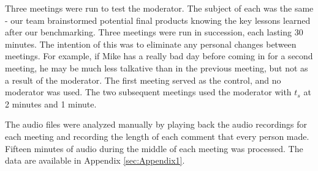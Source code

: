 Three meetings were run to test the moderator. The subject of each was the same - our team brainstormed potential final products knowing the key lessons learned after our benchmarking. Three meetings were run in succession, each lasting 30 minutes. The intention of this was to eliminate any personal changes between meetings. For example, if Mike has a really bad day before coming in for a second meeting, he may be much less talkative than in the previous meeting, but not as a result of the moderator. The first meeting served as the control, and no moderator was used. The two subsequent meetings used the moderator with $t_{s}$ at 2 minutes and 1 minute.

The audio files were analyzed manually by playing back the audio recordings for each meeting and recording the length of each comment that every person made. Fifteen minutes of audio during the middle of each meeting was processed. The data are available in Appendix \ref{sec:Appendix1}. 


